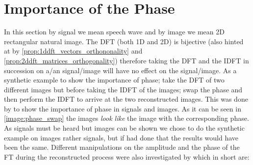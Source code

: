 \section{Importance of the Phase}\label{sec:phase_importance}
In this section by signal we mean speech wave  and by image we mean 2D rectangular natural image. The \ac{DFT} (both 1D and 2D) is bijective\cite{Damelin2011} (also hinted  at by \cref{prop:1ddft_vectors_orthononality} and 
\cref{prop:2ddft_matrices_orthogonality}) therefore  taking the \ac{DFT} and the \ac{IDFT} in succession on a/an signal/image will have no effect on the signal/image.
 As a synthetic example to show the importance of phase; take the \ac{DFT} of two different images but before taking the \ac{IDFT} of the images; 
 swap the phase and then perform the \ac{IDFT} to arrive at the two reconstructed images. This was done by \cite{Oppenheim1981} to show the importance of 
 phase in signals and images. As it can be seen in \cref{image:phase_swap}  the images \emph{look like} the image with the corresponding phase. As signals must 
 be heard but images can be shown we chose to do the synthetic example on images rather signals, but if had 
 done that the results would have been the same. Different manipulations on the amplitude and the phase of the \ac{FT} during the reconstructed process 
 were also investigated by \cite{Oppenheim1979}\cite{Oppenheim1981} which in short are:

